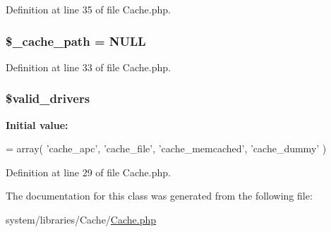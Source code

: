 Definition at line 35 of file Cache.\-php.

\hypertarget{class_c_i___cache_ae9407d6ae1ddd132cca3c7f855f89dfe}{
\subsubsection[{\$\-\_\-cache\-\_\-path}]{\setlength{\rightskip}{0pt plus 5cm}\$\-\_\-cache\-\_\-path = N\-U\-L\-L\hspace{0.3cm}{\ttfamily [protected]}}}\label{class_c_i___cache_ae9407d6ae1ddd132cca3c7f855f89dfe}


Definition at line 33 of file Cache.\-php.

\hypertarget{class_c_i___cache_a32d963b3d49fd67f188c1a74d38be6df}{
\subsubsection[{\$valid\-\_\-drivers}]{\setlength{\rightskip}{0pt plus 5cm}\$valid\-\_\-drivers\hspace{0.3cm}{\ttfamily [protected]}}}\label{class_c_i___cache_a32d963b3d49fd67f188c1a74d38be6df}
{\bfseries Initial value\-:}
\begin{DoxyCode}
= array(
        \textcolor{stringliteral}{'cache\_apc'}, \textcolor{stringliteral}{'cache\_file'}, \textcolor{stringliteral}{'cache\_memcached'}, \textcolor{stringliteral}{'cache\_dummy'}
    )
\end{DoxyCode}


Definition at line 29 of file Cache.\-php.



The documentation for this class was generated from the following file\-:\begin{DoxyCompactItemize}
\item 
system/libraries/\-Cache/\hyperlink{_cache_8php}{Cache.\-php}\end{DoxyCompactItemize}
